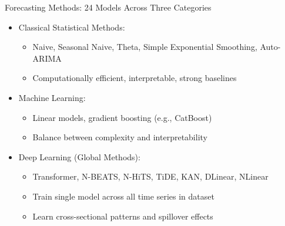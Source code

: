 \documentclass[ignorenonframetext, 9pt]{beamer}
\begin{document}
\begin{frame}{Forecasting Methods: 24 Models Across Three Categories}
\begin{itemize}
\item \alert{Classical Statistical Methods:}
\begin{itemize}
  \item Naive, Seasonal Naive, Theta, Simple Exponential Smoothing, Auto-ARIMA
  \item Computationally efficient, interpretable, strong baselines
\end{itemize}
\vspace{0.3cm}
\item \alert{Machine Learning:}
\begin{itemize}
  \item Linear models, gradient boosting (e.g., CatBoost)
  \item Balance between complexity and interpretability
\end{itemize}
\vspace{0.3cm}
\item \alert{Deep Learning (Global Methods):}
\begin{itemize}
  \item Transformer, N-BEATS, N-HiTS, TiDE, KAN, DLinear, NLinear
  \item Train single model across all time series in dataset
  \item Learn cross-sectional patterns and spillover effects
\end{itemize}
\end{itemize}
\end{frame}
\end{document}
